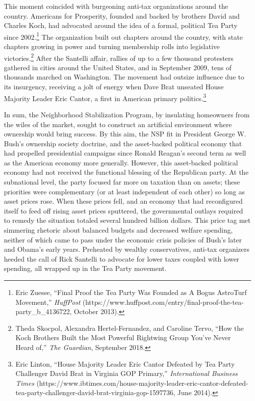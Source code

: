 \documentclass[12pt,oneside]{psthesis}
\begin{document}
This moment coincided with burgeoning anti-tax organizations around the country.
Americans for Prosperity, founded and backed by brothers David and Charles Koch, had advocated around the idea of a formal, political Tea Party since 2002.\footnote{Eric Zuesse, ``Final Proof the Tea Party Was Founded as A Bogus AstroTurf Movement,'' \emph{HuffPost} (https://www.huffpost.com/entry/final-proof-the-tea-party\_b\_4136722, October 2013).}
The organization built out chapters around the country, with state chapters growing in power and turning membership rolls into legislative victories.\footnote{Theda Skocpol, Alexandra Hertel-Fernandez, and Caroline Tervo, ``How the Koch Brothers Built the Most Powerful Rightwing Group You've Never Heard of,'' \emph{The Guardian}, September 2018.}
After the Santelli affair, rallies of up to a few thousand protesters gathered in cities around the United States, and in September 2009, tens of thousands marched on Washington.
The movement had outsize influence due to its insurgency, receiving a jolt of energy when Dave Brat unseated House Majority Leader Eric Cantor, a first in American primary politics.\footnote{Eric Linton, ``House Majority Leader Eric Cantor Defeated by Tea Party Challenger David Brat in Virginia GOP Primary,'' \emph{International Business Times} (https://www.ibtimes.com/house-majority-leader-eric-cantor-defeated-tea-party-challenger-david-brat-virginia-gop-1597736, June 2014).}

In sum, the Neighborhood Stabilization Program, by insulating homeowners from the wiles of the market, sought to construct an artificial environment where ownership would bring success.
By this aim, the NSP fit in President George W. Bush's ownership society doctrine, and the asset-backed political economy that had propelled presidential campaigns since Ronald Reagan's second term as well as the American economy more generally.
However, this asset-backed political economy had not received the functional blessing of the Republican party. At the subnational level, the party focused far more on taxation than on assets; these priorities were complementary (or at least independent of each other) so long as asset prices rose.
When these prices fell, and an economy that had reconfigured itself to feed off rising asset prices sputtered, the governmental outlays required to remedy the situation totaled several hundred billion dollars.
This price tag met simmering rhetoric about balanced budgets and decreased welfare spending, neither of which came to pass under the economic crisis policies of Bush's later and Obama's early years.
Preheated by wealthy conservatives, anti-tax organizers heeded the call of Rick Santelli to advocate for lower taxes coupled with lower spending, all wrapped up in the Tea Party movement.
\end{document}
